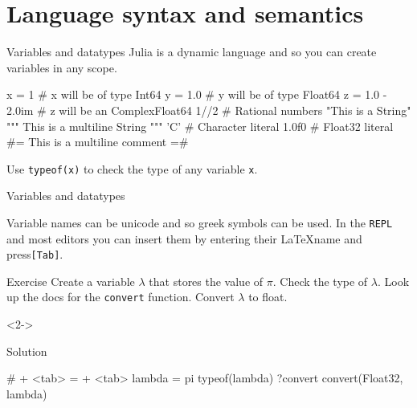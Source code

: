 \documentclass{beamer}
\newenvironment{Boxx}{\begin{tcolorbox}[standard jigsaw, opacityframe=0.8, opacityback=0.0]}{\end{tcolorbox}}
\begin{document}
\section{Language syntax and semantics}
\begin{frame}[fragile]{Variables and datatypes}
  Julia is a dynamic language and so you can create variables in any scope.
  \begin{Boxx}
  \begin{jllisting}
  x = 1   # x will be of type Int64
  y = 1.0 # y will be of type Float64
  z = 1.0 - 2.0im # z will be an Complex{Float64}
  1//2 # Rational numbers
  "This is a String"
  """
  This is a multiline
  String
  """
  'C' # Character literal
  1.0f0 # Float32 literal
  #=
  This is a multiline comment
  =#
  \end{jllisting}
\end{Boxx}
  Use \verb|typeof(x)| to check the type of any variable \verb|x|.
\end{frame}

\begin{frame}[fragile]{Variables and datatypes}
	\begin{overlayarea}{\linewidth}{7cm}
	
	Variable names can be unicode and so greek symbols can be used. In the \verb|REPL| and most editors you can insert them by entering their \LaTeX name and press\verb|[Tab]|.
	
	\begin{block}{Exercise}
		Create a variable $\lambda$ that stores the value of $\pi$.
		Check the type of $\lambda$.
		Look up the docs for the \verb|convert| function.
		Convert $\lambda$ to float.
	\end{block}
	\vfill
	\begin{onlyenv}<2->
	\begin{block}{Solution}
		\vspace*{1mm}
		\begin{jllisting}
  # \lambda + <tab> = \pi + <tab>
  lambda = pi
  typeof(lambda)
  ?convert
  convert(Float32, lambda)
		\end{jllisting}
	\vspace*{1mm}
	\end{block}
\end{onlyenv}
\end{overlayarea}
\end{frame}
\end{document}
